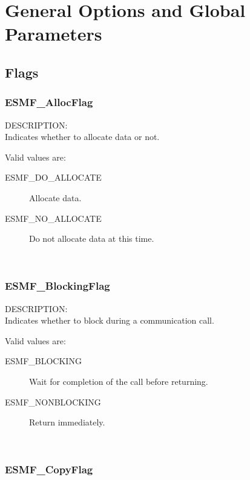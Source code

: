 
\section{General Options and Global Parameters}

\subsection{Flags}

\subsubsection{ESMF\_AllocFlag}

{\sf DESCRIPTION:\\}  
Indicates whether to allocate data or not.

Valid values are:
\begin{description}
\item [ESMF\_DO\_ALLOCATE]
      Allocate data. 
\item [ESMF\_NO\_ALLOCATE]
      Do not allocate data at this time. 
\end{description}

\mbox{}\hrulefill\

\subsubsection{ESMF\_BlockingFlag}

{\sf DESCRIPTION:\\}  
Indicates whether to block during a communication call.

Valid values are:
\begin{description}

\item [ESMF\_BLOCKING]
      Wait for completion of the call before returning. 
\item [ESMF\_NONBLOCKING]
      Return immediately. 
\end{description}

\mbox{}\hrulefill\


\subsubsection{ESMF\_CopyFlag}

